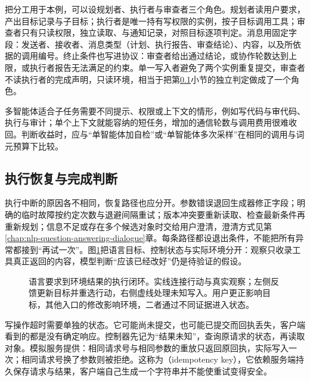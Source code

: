 把分工用于本例，可以设规划者、执行者与审查者三个角色。规划者读用户要求，产出目标记录与子目标；执行者是唯一持有写权限的实例，按子目标调用工具；审查者只有只读权限，独立读取、与通知记录，对照目标逐项判定。消息用固定字段：发送者、接收者、消息类型（计划、执行报告、审查结论）、内容，以及所依据的调用编号。终止条件也写进协议：审查者给出通过结论，或协作轮数达到上限，或执行者报告无法满足的约束。单一写入者避免了两个实例重复提交，审查者不读执行者的完成声明，只读环境，相当于把第\ref{sec:nlp-execution-recovery}小节的独立判定做成了一个角色。

多智能体适合子任务需要不同提示、权限或上下文的情形，例如写代码与审代码、执行与审计；单个上下文就能容纳的短任务，增加的通信轮数与调用费用很难收回。判断收益时，应与“单智能体加自检”或“单智能体多次采样”在相同的调用与词元预算下比较。

\subsection{执行恢复与完成判断}
\label{sec:nlp-execution-recovery}

执行中断的原因各不相同，恢复路径也应分开。参数错误退回生成器修正字段；明确的临时故障按约定次数与退避间隔重试；版本冲突要重新读取、检查最新条件再重新规划；信息不足或存在多个候选对象时交给用户澄清，澄清方式见第\ref{chap:nlp-question-answering-dialogue}章。每条路径都设退出条件，不能把所有异常都接到“再试一次”。图\ref{fig:nlp-execution-environment-loop}把语言目标、控制状态与实际环境分开：观察只收录工具真正返回的内容，模型判断“应该已经改好”仍是待验证的假设。

\begin{figure}[htbp]
  \centering
  
  \caption{语言要求到环境结果的执行闭环。实线连接行动与真实观察；左侧反馈更新目标并重选行动，右侧虚线处理未知写入。用户更正影响目标，其他入口的修改影响环境，二者通过不同证据进入状态。}
  \label{fig:nlp-execution-environment-loop}
\end{figure}
\FloatBarrier

写操作超时需要单独的状态。它可能尚未提交，也可能已提交而回执丢失，客户端看到的都是没有确定响应。控制器先记为“结果未知”，查询原请求的状态，再读取对象。模拟服务提供：相同请求号与相同参数的重放只返回原回执，实际写入一次；相同请求号换了参数则被拒绝。这称为（idempotency key），它依赖服务端持久保存请求与结果，客户端自己生成一个字符串并不能使重试变得安全。

